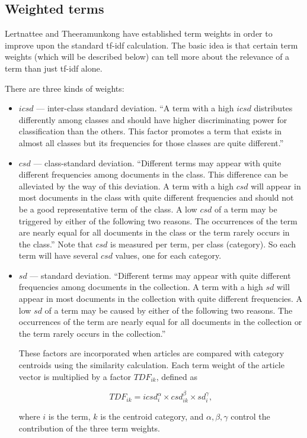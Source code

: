 \documentclass{article}
\begin{document}
\subsection{Weighted terms}

Lertnattee and Theeramunkong \cite{lertnattee2004effect} have established term
weights in order to improve upon the standard tf-idf calculation. The basic
idea is that certain term weights (which will be described below) can tell more
about the relevance of a term than just tf-idf alone.

There are three kinds of weights:

\begin{itemize}

\item $icsd$ --- inter-class standard deviation. ``A term with a high $icsd$
distributes differently among classes and should have higher discriminating
power for classification than the others. This factor promotes a term that
exists in almost all classes but its frequencies for those classes are quite
different.'' \cite{lertnattee2004effect}

\item $csd$ --- class-standard deviation. ``Different terms may appear with
quite different frequencies among documents in the class. This difference can
be alleviated by the way of this deviation. A term with a high $csd$ will
appear in most documents in the class with quite different frequencies and
should not be a good representative term of the class. A low $csd$ of a term
may be triggered by either of the following two reasons. The occurrences of the
term are nearly equal for all documents in the class or the term rarely occurs
in the class.'' \cite{lertnattee2004effect} Note that $csd$ is measured per
term, per class (category). So each term will have several $csd$ values, one
for each category.

\item $sd$ --- standard deviation. ``Different terms may appear with quite
different frequencies among documents in the collection. A term with a high
$sd$ will appear in most documents in the collection with quite different
frequencies. A low $sd$ of a term may be caused by either of the following two
reasons. The occurrences of the term are nearly equal for all documents in the
collection or the term rarely occurs in the collection.''
\cite{lertnattee2004effect}

These factors are incorporated when articles are compared with category
centroids using the similarity calculation. Each term weight of the article
vector is multiplied by a factor $TDF_{ik}$, defined as

\begin{equation*}
TDF_{ik} = icsd_i^\alpha \times csd_{ik}^\beta \times sd_i^\gamma,
\end{equation*}

where $i$ is the term, $k$ is the centroid category, and $\alpha,\beta,\gamma$
control the contribution of the three term weights.

\end{itemize}
\end{document}
